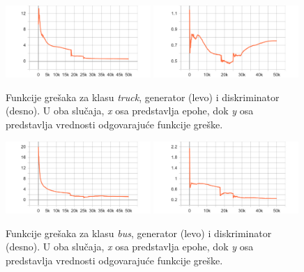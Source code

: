 \documentclass[12pt,oneside]{memoir}
\begin{document}
\begin{figure}[!htbp]
\centering
  \includegraphics[width=0.49\textwidth]{matfmaster/stylegan/truck/g_loss.png}
  \includegraphics[width=0.49\textwidth]{matfmaster/stylegan/truck/d_loss.png}
\caption{Funkcije grešaka za klasu \textit{truck}, generator (levo) i diskriminator (desno). U oba slučaja, \textit{x} osa predstavlja epohe, dok \textit{y} osa predstavlja vrednosti odgovarajuće funkcije greške.}\label{fig:section4_stylegan_truck_loss}
\end{figure}


\begin{figure}[!htbp]
\centering
  \includegraphics[width=0.49\textwidth]{matfmaster/stylegan/bus/g_loss.png}
  \includegraphics[width=0.49\textwidth]{matfmaster/stylegan/bus/d_loss.png}
\caption{Funkcije grešaka za klasu \textit{bus}, generator (levo) i diskriminator (desno). U oba slučaja, \textit{x} osa predstavlja epohe, dok \textit{y} osa predstavlja vrednosti odgovarajuće funkcije greške.}\label{fig:section4_stylegan_bus_loss}
\end{figure}
\end{document}
